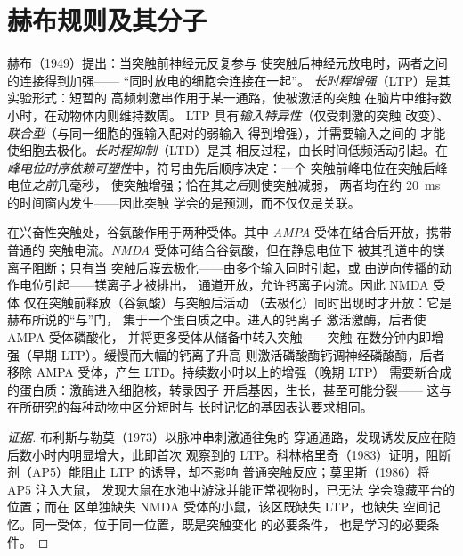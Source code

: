 \section{赫布规则及其分子}

\begin{definition}\label{def:b3:learning-memory:ltp}
赫布（1949）提出：当突触前神经元反复参与
使突触后神经元放电时，两者之间的连接得到加强——
“同时放电的细胞会连接在一起”。
\emph{长时程增强}（LTP）是其实验形式：短暂的
高频刺激串作用于某一通路，使被激活的突触
在脑片中维持数小时，在动物体内则维持数周。
LTP 具有\emph{输入特异性}（仅受刺激的突触
改变）、\emph{联合型}（与同一细胞的强输入配对的弱输入
得到增强），并需要输入之间的\emph{}
才能使细胞去极化。\emph{长时程抑制}（LTD）是其
相反过程，由长时间低频活动引起。在
\emph{峰电位时序依赖可塑性}中，符号由先后顺序决定：一个
突触前峰电位在突触后峰电位\emph{之前}几毫秒，
使突触增强；恰在其\emph{之后}则使突触减弱，
两者均在约 \qty{20}{ms} 的时间窗内发生——因此突触
学会的是预测，而不仅仅是关联。
\end{definition}

\begin{proposition}\label{prop:b3:learning-memory:nmda}
在兴奋性突触处，谷氨酸作用于两种受体。其中
\emph{AMPA} 受体在结合后开放，携带普通的
突触电流。\emph{NMDA} 受体可结合谷氨酸，但在静息电位下
被其孔道中的镁离子阻断；只有当
突触后膜去极化——由多个输入同时引起，或
由逆向传播的动作电位引起——镁离子才被排出，
通道开放，允许钙离子内流。因此 NMDA 受体
仅在突触前释放（谷氨酸）与突触后活动
（去极化）同时出现时才开放：它是赫布所说的“与”门，
集于一个蛋白质之中。进入\emph{}的钙离子
激活激酶\emph{}，后者使 AMPA 受体磷酸化，
并将更多受体从储备中转入突触——突触
在数分钟内即增强（早期 LTP）。缓慢而大幅的钙离子升高
则激活磷酸酶钙调神经磷酸酶，后者移除
AMPA 受体，产生 LTD。持续数小时以上的增强（晚期 LTP）
需要新合成的蛋白质：激酶进入细胞核，转录因子
\emph{} 开启基因，生长，甚至可能分裂——
这与在所研究的每种动物中区分短时与
长时记忆的基因表达要求相同。
\end{proposition}

\begin{proof}[证据]
布利斯与勒莫（1973）以脉冲串刺激通往兔的
穿通通路，发现诱发反应在随后数小时内明显增大，此即首次
观察到的 LTP。科林格里奇（1983）证明，阻断剂（AP5）能阻止 LTP 的诱导，却不影响
普通突触反应；莫里斯（1986）将 AP5 注入大鼠，
发现大鼠在水池中游泳并能正常视物时，已无法
学会隐藏平台的位置；而在  区单独缺失
NMDA 受体的小鼠，该区既缺失 LTP，也缺失
空间记忆。同一受体，位于同一位置，既是突触变化
的必要条件，
也是学习的必要条件。
\end{proof}

